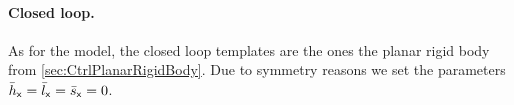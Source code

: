 
\paragraph{Closed loop.}
As for the model, the closed loop templates are the ones the planar rigid body from \autoref{sec:CtrlPlanarRigidBody}. 
Due to symmetry reasons we set the parameters $\bar{h}_{\mathsf{x}}=\bar{l}_{\mathsf{x}}=\bar{s}_{\mathsf{x}}=0$.
